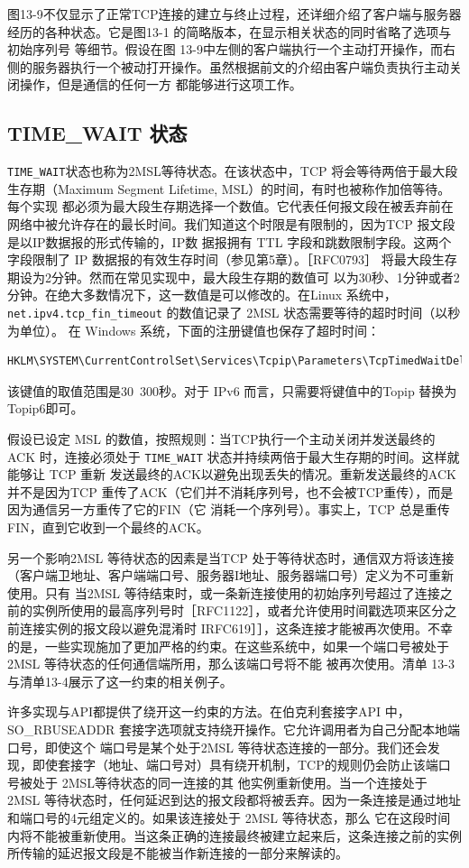 图13-9不仅显示了正常TCP连接的建立与终止过程，还详细介绍了客户端与服务器经历的各种状态。它是图13-1 的简略版本，在显示相关状态的同时省略了选项与初始序列号
等细节。假设在图 13-9中左侧的客户端执行一个主动打开操作，而右侧的服务器执行一个被动打开操作。虽然根据前文的介绍由客户端负责执行主动关闭操作，但是通信的任何一方
都能够进行这项工作。

\subsection{ TIME\_WAIT 状态 }
\verb|TIME_WAIT|状态也称为2MSL等待状态。在该状态中，TCP 将会等待两倍于最大段生存期（Maximum Segment Lifetime, MSL）的时间，有时也被称作加倍等待。每个实现
都必须为最大段生存期选择一个数值。它代表任何报文段在被丢弃前在网络中被允许存在的最长时间。我们知道这个时限是有限制的，因为TCP 报文段是以IP数据报的形式传输的，IP数
据报拥有 TTL 字段和跳数限制字段。这两个字段限制了 IP 数据报的有效生存时间（参见第5章）。［RFC0793］ 将最大段生存期设为2分钟。然而在常见实现中，最大段生存期的数值可
以为30秒、1分钟或者2分钟。在绝大多数情况下，这一数值是可以修改的。在Linux 系统中，\verb|net.ipv4.tcp_fin_timeout| 的数值记录了 2MSL 状态需要等待的超时时间（以秒为单位）。
在 Windows 系统，下面的注册键值也保存了超时时间：
\begin{lstlisting}[language=bash]
HKLM\SYSTEM\CurrentControlSet\Services\Tcpip\Parameters\TcpTimedWaitDelay
\end{lstlisting}
该键值的取值范围是30~300秒。对于 IPv6 而言，只需要将键值中的Topip 替换为 Topip6即可。

假设已设定 MSL 的数值，按照规则：当TCP执行一个主动关闭并发送最终的ACK 时，连接必须处于 \verb|TIME_WAIT| 状态并持续两倍于最大生存期的时间。这样就能够让 TCP 重新
发送最终的ACK以避免出现丢失的情况。重新发送最终的ACK 并不是因为TCP 重传了ACK（它们并不消耗序列号，也不会被TCP重传），而是因为通信另一方重传了它的FIN（它
消耗一个序列号）。事实上，TCP 总是重传 FIN，直到它收到一个最终的ACK。

另一个影响2MSL 等待状态的因素是当TCP 处于等待状态时，通信双方将该连接（客户端卫地址、客户端端口号、服务器I地址、服务器端口号）定义为不可重新使用。只有
当2MSL 等待结束时，或一条新连接使用的初始序列号超过了连接之前的实例所使用的最高序列号时［RFC1122］，或者允许使用时间戳选项来区分之前连接实例的报文段以避免混淆时
IRFC619］］，这条连接才能被再次使用。不幸的是，一些实现施加了更加严格的约束。在这些系统中，如果一个端口号被处于 2MSL 等待状态的任何通信端所用，那么该端口号将不能
被再次使用。清单 13-3与清单13-4展示了这一约束的相关例子。

许多实现与API都提供了绕开这一约束的方法。在伯克利套接字API 中，SO\_RBUSEADDR 套接字选项就支持绕开操作。它允许调用者为自己分配本地端口号，即使这个
端口号是某个处于2MSL 等待状态连接的一部分。我们还会发现，即使套接字（地址、端口号对）具有绕开机制，TCP的规则仍会防止该端口号被处于 2MSL等待状态的同一连接的其
他实例重新使用。当一个连接处于 2MSL 等待状态时，任何延迟到达的报文段都将被丢弃。因为一条连接是通过地址和端口号的4元组定义的。如果该连接处于 2MSL 等待状态，那么
它在这段时间内将不能被重新使用。当这条正确的连接最终被建立起来后，这条连接之前的实例所传输的延迟报文段是不能被当作新连接的一部分来解读的。

